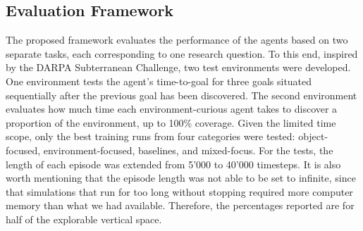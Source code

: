        
        
        
        
        
        
        
        
        


    \subsection{Evaluation Framework}

        The proposed framework evaluates the performance of the agents based on two separate tasks, each corresponding to one research question. To this end, inspired by the DARPA Subterranean Challenge, two test environments were developed. One environment tests the agent's time-to-goal for three goals situated sequentially after the previous goal has been discovered. The second environment evaluates how much time each environment-curious agent takes to discover a proportion of the environment, up to 100\% coverage. Given the limited time scope, only the best training runs from four categories were tested: object-focused, environment-focused, baselines, and mixed-focus. For the tests, the length of each episode was extended from 5'000 to 40'000 timesteps. It is also worth mentioning that the episode length was not able to be set to infinite, since that simulations that run for too long without stopping required more computer memory than what we had available. Therefore, the percentages reported are for half of the explorable vertical space. 
        
